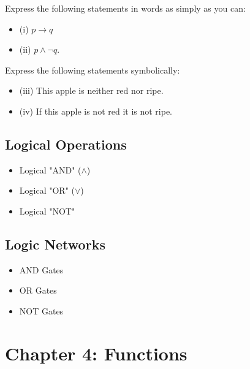 \documentclass{article}
\begin{document}
Express the following statements in words as simply as you can:
\begin{itemize}
\item (i) $p \rightarrow q$
\item (ii) $p \wedge \neg q$.
\end{itemize}

 
Express the following statements symbolically:
\begin{itemize}
\item (iii) This apple is neither red nor ripe.
\item (iv) If this apple is not red it is not ripe.
\end{itemize}



\subsection{Logical Operations}

\begin{itemize}
\item Logical "AND" ($\wedge$)
\item Logical "OR" ($\vee$)
\item Logical "NOT" 
\end{itemize}
\newpage

\subsection*{Logic Networks}
\begin{itemize}
\item AND Gates
\item OR Gates
\item NOT Gates
\end{itemize}

\newpage

\section*{Chapter 4: Functions}
\end{document}
